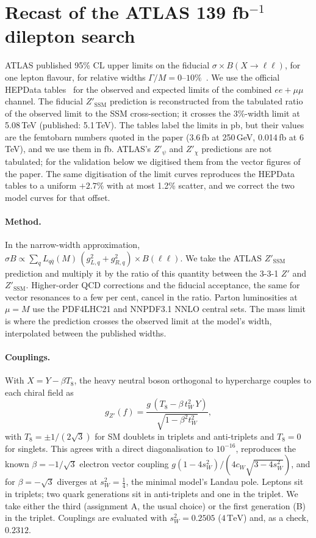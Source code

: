 \documentclass[11pt,a4paper]{article}
\newcommand{\TeV}{\,\mathrm{TeV}}
\begin{document}
\appendix
\section{Recast of the ATLAS 139 fb$^{-1}$ dilepton search}\label{app:recast}

ATLAS published 95\% CL upper limits on the fiducial $\sigma\times B(X\to\ell\ell)$, for one
lepton flavour, for relative widths $\Gamma/M=0$--$10\%$~\cite{ATLAS:2019erb}. We use the
official HEPData tables~\cite{HEPData:88425} for the observed and expected limits of the
combined $ee+\mu\mu$ channel. The fiducial $Z'_{\text{SSM}}$ prediction is reconstructed
from the tabulated ratio of the observed limit to the SSM cross-section; it crosses the
3\%-width limit at 5.08\,TeV (published: 5.1\,TeV). The tables label the limits in pb, but
their values are the femtobarn numbers quoted in the paper (3.6\,fb at 250\,GeV,
0.014\,fb at 6\,TeV), and we use them in fb. ATLAS's $Z'_\psi$ and $Z'_\chi$ predictions are
not tabulated; for the validation below we digitised them from the vector figures of the
paper. The same digitisation of the limit curves reproduces the HEPData tables to a uniform
$+2.7\%$ with at most 1.2\% scatter, and we correct the two model curves for that offset.

\paragraph{Method.} In the narrow-width approximation,
$\sigma B\propto\sum_q L_{q\bar q}(M)\,(g_{L,q}^2+g_{R,q}^2)\times B(\ell\ell)$. We take the
ATLAS $Z'_{\text{SSM}}$ prediction and multiply it by the ratio of this quantity between
the 3-3-1 $Z'$ and $Z'_{\text{SSM}}$. Higher-order QCD corrections and the fiducial
acceptance, the same for vector resonances to a few per cent, cancel in the ratio. Parton
luminosities at $\mu=M$ use the PDF4LHC21 and NNPDF3.1 NNLO central sets. The mass limit
is where the prediction crosses the observed limit at the model's width, interpolated
between the published widths.

\paragraph{Couplings.} With $X=Y-\beta T_8$, the heavy neutral boson orthogonal to
hypercharge couples to each chiral field as
\begin{equation}
g_{Z'}(f)=\frac{g\,(T_8-\beta\,t_W^2\,Y)}{\sqrt{1-\beta^2t_W^2}},
\end{equation}
with $T_8=\pm1/(2\sqrt3)$ for SM doublets in triplets and anti-triplets and $T_8=0$ for
singlets. This agrees with a direct diagonalisation to $10^{-16}$, reproduces the known
$\beta=-1/\sqrt3$ electron vector coupling $g(1-4s_W^2)/(4c_W\sqrt{3-4s_W^2})$, and for
$\beta=-\sqrt3$ diverges at $s_W^2=\tfrac14$, the minimal model's Landau pole. Leptons sit
in triplets; two quark generations sit in anti-triplets and one in the triplet. We take
either the third (assignment A, the usual choice) or the first generation (B) in the
triplet. Couplings are evaluated with $s_W^2=0.2505$ ($4\TeV$) and, as a check, $0.2312$.
\end{document}
